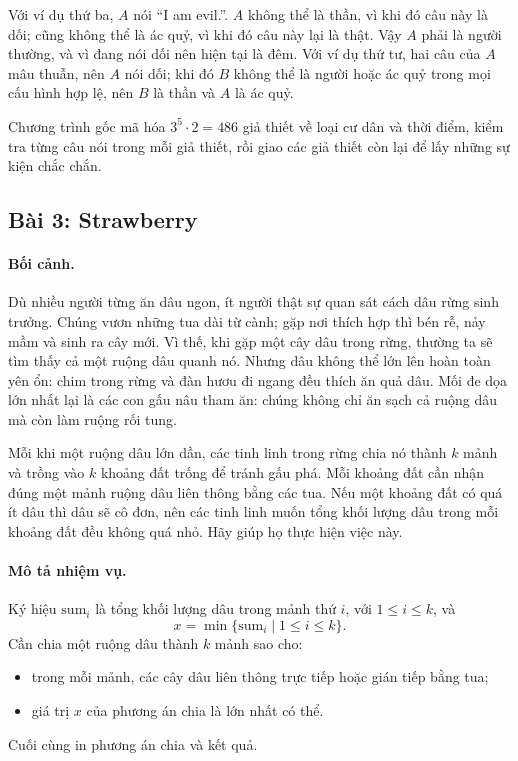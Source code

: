 \documentclass[11pt]{article}
\begin{document}
Với ví dụ thứ ba, \(A\) nói ``I am evil.''. \(A\) không thể là thần, vì khi đó
câu này là dối; cũng không thể là ác quỷ, vì khi đó câu này lại là thật. Vậy
\(A\) phải là người thường, và vì đang nói dối nên hiện tại là đêm. Với ví dụ
thứ tư, hai câu của \(A\) mâu thuẫn, nên \(A\) nói dối; khi đó \(B\) không thể
là người hoặc ác quỷ trong mọi cấu hình hợp lệ, nên \(B\) là thần và \(A\) là
ác quỷ.

Chương trình gốc mã hóa \(3^5\cdot 2=486\) giả thiết về loại cư dân và thời
điểm, kiểm tra từng câu nói trong mỗi giả thiết, rồi giao các giả thiết còn
lại để lấy những sự kiện chắc chắn.

\subsection{Bài 3: Strawberry}

\paragraph{Bối cảnh.}
Dù nhiều người từng ăn dâu ngon, ít người thật sự quan sát cách dâu rừng sinh
trưởng. Chúng vươn những tua dài từ cành; gặp nơi thích hợp thì bén rễ, nảy
mầm và sinh ra cây mới. Vì thế, khi gặp một cây dâu trong rừng, thường ta sẽ
tìm thấy cả một ruộng dâu quanh nó. Nhưng dâu không thể lớn lên hoàn toàn yên
ổn: chim trong rừng và đàn hươu đi ngang đều thích ăn quả dâu. Mối đe dọa lớn
nhất lại là các con gấu nâu tham ăn: chúng không chỉ ăn sạch cả ruộng dâu mà
còn làm ruộng rối tung.

Mỗi khi một ruộng dâu lớn dần, các tinh linh trong rừng chia nó thành \(k\)
mảnh và trồng vào \(k\) khoảng đất trống để tránh gấu phá. Mỗi khoảng đất cần
nhận đúng một mảnh ruộng dâu liên thông bằng các tua. Nếu một khoảng đất có
quá ít dâu thì dâu sẽ cô đơn, nên các tinh linh muốn tổng khối lượng dâu trong
mỗi khoảng đất đều không quá nhỏ. Hãy giúp họ thực hiện việc này.

\paragraph{Mô tả nhiệm vụ.}
Ký hiệu \(\mathrm{sum}_i\) là tổng khối lượng dâu trong mảnh thứ \(i\), với
\(1\le i\le k\), và
\[
  x=\min\{\mathrm{sum}_i\mid 1\le i\le k\}.
\]
Cần chia một ruộng dâu thành \(k\) mảnh sao cho:
\begin{itemize}
  \item trong mỗi mảnh, các cây dâu liên thông trực tiếp hoặc gián tiếp bằng
  tua;
  \item giá trị \(x\) của phương án chia là lớn nhất có thể.
\end{itemize}
Cuối cùng in phương án chia và kết quả.
\end{document}
